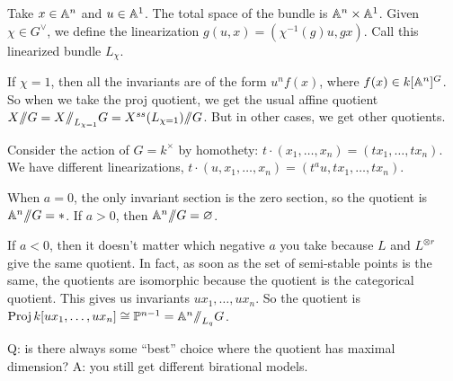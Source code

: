 Take $x\in \AA^n$ and $u\in \AA^1$. The total space of the bundle is $\AA^n\times \AA^1$. Given $\chi\in G^\vee$, we define the linearization $g(u,x)=(\chi^{-1}(g)u,gx)$. Call this linearized bundle $L_\chi$.

If $\chi=1$, then all the invariants are of the form $u^nf(x)$, where $f(x)\in k[\AA^n]^G$. So when we take the proj quotient, we get the usual affine quotient $X\quot G=X\quot_{L_{\chi=1}}G=X^{ss}(L_{\chi=1})\quot G$. But in other cases, we get other quotients.

\begin{example}
 Consider the action of $G=k^\times$ by homothety: $t\cdot (x_1,\dots, x_n)=(tx_1,\dots, tx_n)$. We have different linearizations, $t\cdot (u,x_1,\dots, x_n)=(t^au,tx_1,\dots, tx_n)$.
 
 When $a=0$, the only invariant section is the zero section, so the quotient is $\AA^n\quot G=*$. If $a>0$, then $\AA^n\quot G=\varnothing$.
 
 If $a<0$, then it doesn't matter which negative $a$ you take because $L$ and $L^{\otimes r}$ give the same quotient. In fact, as soon as the set of semi-stable points is the same, the quotients are isomorphic because the quotient is the categorical quotient. This gives us invariants $ux_1,\dots, ux_n$. So the quotient is $\proj k[ux_1,\dots, ux_n]\cong \PP^{n-1}=\AA^n\quot_{L_q} G$.
\end{example}
Q: is there always some ``best'' choice where the quotient has maximal dimension? A: you still get different birational models.


